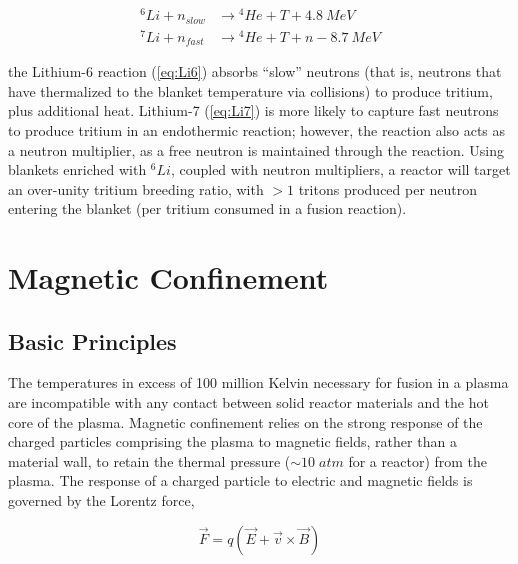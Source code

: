 \begin{align}
 {}^6\si{Li} + \si{n}_{slow} &\rightarrow {}^4\si{He} + \si{T} + \SI{4.8}{MeV}\label{eq:Li6}\\
 {}^7\si{Li} + \si{n}_{fast} &\rightarrow {}^4\si{He} + \si{T} + \si{n} - \SI{8.7}{MeV}\label{eq:Li7}
\end{align}

\noindent the Lithium-6 reaction (\cref{eq:Li6}) absorbs ``slow'' neutrons (that is, neutrons that have thermalized to the blanket temperature via collisions) to produce tritium, plus additional heat.  Lithium-7 (\cref{eq:Li7}) is more likely to capture fast neutrons to produce tritium in an endothermic reaction; however, the reaction also acts as a neutron multiplier, as a free neutron is maintained through the reaction.  Using blankets enriched with ${}^6\si{Li}$, coupled with neutron multipliers, a reactor will target an over-unity tritium breeding ratio, with $>1$ tritons produced per neutron entering the blanket (\ie per tritium consumed in a fusion reaction).\nicesectionending


\section{Magnetic Confinement}\label{sec:intro_magnetic}

\subsection{Basic Principles}\label{subsec:intro_basic}

The temperatures in excess of 100 million Kelvin necessary for fusion in a plasma are incompatible with any contact between solid reactor materials and the hot core of the plasma.  Magnetic confinement relies on the strong response of the charged particles comprising the plasma to magnetic fields, rather than a material wall, to retain the thermal pressure ($\sim 10 \;\si{atm}$ for a reactor) from the plasma.  The response of a charged particle to electric and magnetic fields is governed by the Lorentz force,

\begin{equation}\label{eq:lorentz}
 \vec{F} = q\left(\vec{E} + \vec{v} \times \vec{B}\right)
\end{equation}

